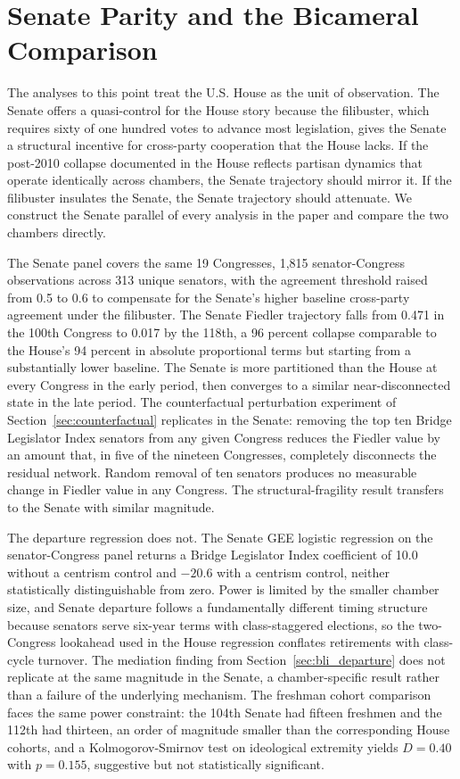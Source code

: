 \documentclass[12pt, a4paper]{article}
\begin{document}
\section{Senate Parity and the Bicameral Comparison}\label{sec:senate}

The analyses to this point treat the U.S. House as the unit of observation. The Senate offers a quasi-control for the House story because the filibuster, which requires sixty of one hundred votes to advance most legislation, gives the Senate a structural incentive for cross-party cooperation that the House lacks. If the post-2010 collapse documented in the House reflects partisan dynamics that operate identically across chambers, the Senate trajectory should mirror it. If the filibuster insulates the Senate, the Senate trajectory should attenuate. We construct the Senate parallel of every analysis in the paper and compare the two chambers directly.

The Senate panel covers the same 19 Congresses, 1{,}815 senator-Congress observations across 313 unique senators, with the agreement threshold raised from 0.5 to 0.6 to compensate for the Senate's higher baseline cross-party agreement under the filibuster. The Senate Fiedler trajectory falls from 0.471 in the 100th Congress to 0.017 by the 118th, a 96 percent collapse comparable to the House's 94 percent in absolute proportional terms but starting from a substantially lower baseline. The Senate is more partitioned than the House at every Congress in the early period, then converges to a similar near-disconnected state in the late period. The counterfactual perturbation experiment of Section~\ref{sec:counterfactual} replicates in the Senate: removing the top ten Bridge Legislator Index senators from any given Congress reduces the Fiedler value by an amount that, in five of the nineteen Congresses, completely disconnects the residual network. Random removal of ten senators produces no measurable change in Fiedler value in any Congress. The structural-fragility result transfers to the Senate with similar magnitude.

The departure regression does not. The Senate GEE logistic regression on the senator-Congress panel returns a Bridge Legislator Index coefficient of 10.0 without a centrism control and $-20.6$ with a centrism control, neither statistically distinguishable from zero. Power is limited by the smaller chamber size, and Senate departure follows a fundamentally different timing structure because senators serve six-year terms with class-staggered elections, so the two-Congress lookahead used in the House regression conflates retirements with class-cycle turnover. The mediation finding from Section~\ref{sec:bli_departure} does not replicate at the same magnitude in the Senate, a chamber-specific result rather than a failure of the underlying mechanism. The freshman cohort comparison faces the same power constraint: the 104th Senate had fifteen freshmen and the 112th had thirteen, an order of magnitude smaller than the corresponding House cohorts, and a Kolmogorov-Smirnov test on ideological extremity yields $D = 0.40$ with $p = 0.155$, suggestive but not statistically significant.
\end{document}
